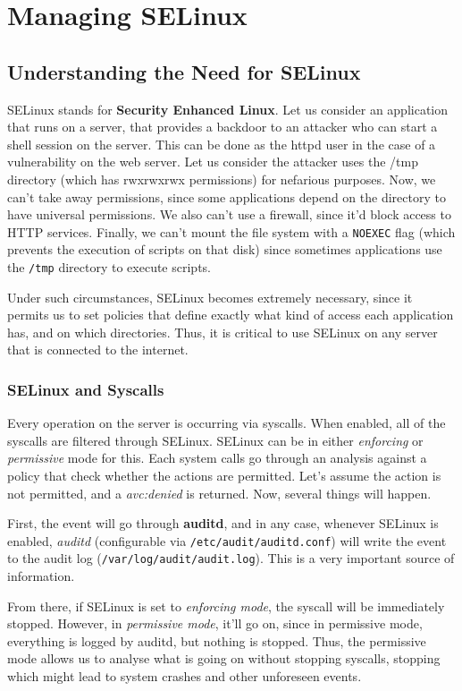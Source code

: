 \chapter{Managing SELinux}
\section{Understanding the Need for SELinux}
SELinux stands for \textbf{Security Enhanced Linux}. Let us consider an application that runs on a server, that provides a backdoor to an attacker who can start a shell session on the server. This can be done as the httpd user in the case of a vulnerability on the web server. Let us consider the attacker uses the /tmp directory (which has rwxrwxrwx permissions) for nefarious purposes. Now, we can't take away permissions, since some applications depend on the directory to have universal permissions. We also can't use a firewall, since it'd block access to HTTP services. Finally, we can't mount the file system with a \verb|NOEXEC| flag (which prevents the execution of scripts on that disk) since sometimes applications use the \verb|/tmp| directory to execute scripts.

Under such circumstances, SELinux becomes extremely necessary, since it permits us to set policies that define exactly what kind of access each application has, and on which directories. Thus, it is critical to use SELinux on any server that is connected to the internet. 

\subsection{SELinux and Syscalls}
Every operation on the server is occurring via syscalls. When enabled, all of the syscalls are filtered through SELinux. SELinux can be in either \textit{enforcing} or \textit{permissive} mode for this. Each system calls go through an analysis against a policy that check whether the actions are permitted. Let's assume the action is not permitted, and a \textit{avc:denied} is returned. Now, several things will happen.

First, the event will go through \textbf{auditd}, and in any case, whenever SELinux is enabled, \textit{auditd} (configurable via \verb|/etc/audit/auditd.conf|) will write the event to the audit log (\verb|/var/log/audit/audit.log|). This is a very important source of information. 

From there, if SELinux is set to \textit{enforcing mode}, the syscall will be immediately stopped. However, in \textit{permissive mode}, it'll go on, since in permissive mode, everything is logged by auditd, but nothing is stopped. Thus, the permissive mode allows us to analyse what is going on without stopping syscalls, stopping which might lead to system crashes and other unforeseen events.

